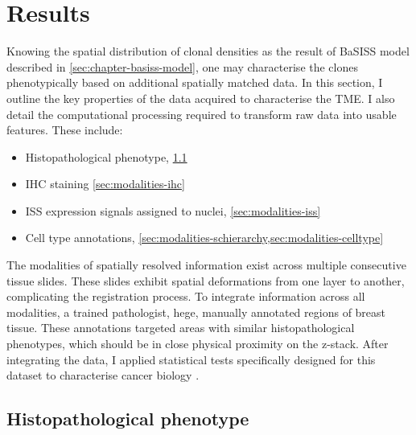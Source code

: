 \section{Results}

\label{sec:modalities-multimodal-results}

Knowing the spatial distribution of clonal densities as the result of \ac{BaSISS} model described in \cref{sec:chapter-basiss-model}, one may characterise the clones phenotypically based on additional spatially matched data. In this section, I outline the key properties of the data acquired to characterise the \ac{TME}. I also detail the computational processing required to transform raw data into usable features. These include:

\begin{itemize}
    \item Histopathological phenotype, \cref{sec:modalities-histopath}
    \item \ac{IHC} staining \cref{sec:modalities-ihc}
    \item \ac{ISS} expression signals assigned to nuclei, \cref{sec:modalities-iss}
    \item Cell type annotations, \cref{sec:modalities-schierarchy,sec:modalities-celltype}
\end{itemize}


The modalities of spatially resolved information exist across multiple consecutive tissue slides. These slides exhibit spatial deformations from one layer to another, complicating the registration process. To integrate information across all modalities, a trained pathologist, \acf{hege}, manually annotated regions of breast tissue. These annotations targeted areas with similar histopathological phenotypes, which should be in close physical proximity on the z-stack. After integrating the data, I applied statistical tests specifically designed for this dataset to characterise cancer biology .

\subsection{Histopathological phenotype}
\label{sec:modalities-histopath}

